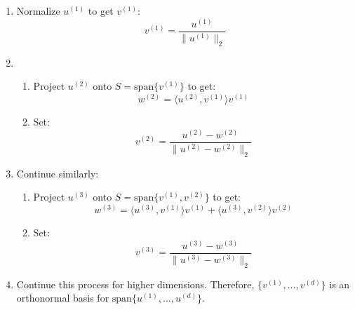     \begin{process}
        \begin{enumerate}
            \item Normalize \( u^{(1)} \) to get \( v^{(1)} \):
            \[
            v^{(1)} = \frac{u^{(1)}}{\|u^{(1)}\|_2}
            \]
        
            \item 
            \begin{enumerate}
                \item Project \( u^{(2)} \) onto \( S = \text{span}\{v^{(1)}\} \) to get:
                \[
                w^{(2)} = \langle u^{(2)}, v^{(1)} \rangle v^{(1)}
                \]
        
                \item Set:
                \[
                v^{(2)} = \frac{u^{(2)} - w^{(2)}}{\|u^{(2)} - w^{(2)}\|_2}
                \]
            \end{enumerate}
        
            \item Continue similarly:
            \begin{enumerate}
                \item Project \( u^{(3)} \) onto \( S = \text{span}\{v^{(1)}, v^{(2)}\} \) to get:
                \[
                w^{(3)} = \langle u^{(3)}, v^{(1)} \rangle v^{(1)} + \langle u^{(3)}, v^{(2)} \rangle v^{(2)}
                \]
        
                \item Set:
                \[
                v^{(3)} = \frac{u^{(3)} - w^{(3)}}{\|u^{(3)} - w^{(3)}\|_2}
                \]
            \end{enumerate}
            
            \item Continue this process for higher dimensions. Therefore, \( \{v^{(1)}, \dots, v^{(d)}\} \) is an orthonormal basis for \( \text{span}\{u^{(1)}, \dots, u^{(d)}\} \).
        
        \end{enumerate}
    \end{process}

